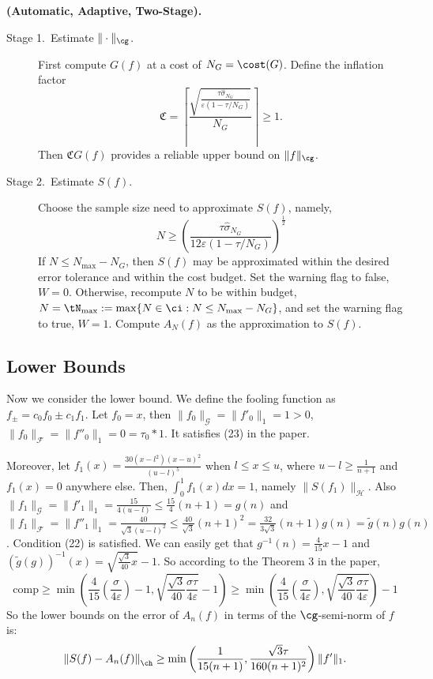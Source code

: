 \begin{algo} \label{twostagedetalgo} {\bf (Automatic, Adaptive, Two-Stage).}

\begin{description}

\item[Stage 1.\ Estimate {$\|\cdot\|_{\cg}$}.] First compute $G(f)$ at a cost of $N_{G} = \cost(G)$.   Define the inflation factor
\begin{equation}\label{norminflate}
\mathfrak{C} =\left\lceil\frac{\sqrt{\frac{\tau \hat{\sigma}_{N_G}}{\varepsilon(1 - \tau/ N_G)}}}{N_{G}}\right\rceil \ge 1.
\end{equation}
Then $\mathfrak{C} G(f)$ provides a reliable upper bound on $\|f\|_{\cg}$.

\item [Stage 2.\ Estimate {$S(f)$}.] Choose the sample size need to approximate $S(f)$, namely,
\[
N \geq \left(\frac{\tau \hat{\sigma}_{N_G}}{12\varepsilon(1-\tau/N_G)}\right)^{\frac{1}{2}}
\]
If $N \le N_{\max}-N_G$, then $S(f)$ may be approximated within the desired error tolerance and within the cost budget.  Set the warning flag to false, $W=0$. Otherwise, recompute $N$ to be within budget, $N = \tN_{\max} := \max\{N \in \ci : N\le N_{\max} -  N_G\}$, and set the warning flag to true, $W=1$.  Compute $A_N(f)$ as the approximation to $S(f)$.
\end{description}
\end{algo}




\subsection{Lower Bounds}
Now we consider the lower bound. We define the fooling function as $f_{\pm}=c_0f_0\pm c_1f_1$. Let $f_0=x$, then $\|f_0\|_{\mathcal{G}}=\|f'_0\|_1=1>0$, $\|f_0\|_{\mathcal{F}}=\|f''_0\|_1=0=\tau_0*1$. It satisfies (23) in the paper.

Moreover, let $f_1(x)=\frac{30(x-l^2)(x-u)^2}{(u-l)^5}$ when $l \leq x \leq u$, where $u-l\geq\frac{1}{n+1}$ and $f_1(x)=0$ anywhere else. Then, $\int_{0}^{1}f_1(x)dx=1$, namely $\|S(f_1)\|_{\mathcal{H}}$. Also $\|f_1\|_{\mathcal{G}}=\|f'_{1}\|_1=\frac{15}{4(u-l)}\leq \frac{15}{4}(n+1)=g(n)$ and $\|f_1\|_{\mathcal{F}}=\|f''_{1}\|_1=\frac{40}{\sqrt{3}(u-l)^2}\leq \frac{40}{\sqrt{3}}(n+1)^2=\frac{32}{3\sqrt{3}}(n+1)g(n)=\tilde{g}(n)g(n)$. Condition (22) is satisfied. We can easily get that $g^{-1}(n)=\frac{4}{15}x-1$ and $(\tilde{g}(g))^{-1}(x)=\sqrt{\frac{\sqrt{3}}{40}x}-1$. So according to the Theorem 3 in the paper, $$\text{comp}\geq \min\left(\frac{4}{15}(\frac{\sigma}{4\varepsilon})-1,\sqrt{\frac{\sqrt{3}}{40}\frac{\sigma\tau}{4\varepsilon}}-1\right)\geq\min\left(\frac{4}{15}(\frac{\sigma}{4\varepsilon}),\sqrt{\frac{\sqrt{3}}{40}\frac{\sigma\tau}{4\varepsilon}}\right)-1$$
So the lower bounds on the error of $A_n(f)$ in terms of the $\cg$-semi-norm of $f$ is:
$$\left\|S(f)-A_n(f)\right\|_{\ch} \geq \min\left(\frac{1}{15(n+1)},\frac{\sqrt{3}\tau}{160(n+1)^2}\right)\|f'\|_{1}.$$
